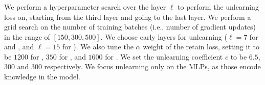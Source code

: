 \subsubsection{\method{}}
We perform a hyperparameter search over the layer $\ell$ to perform the unlearning loss on, starting from the third layer and going to the last layer. We perform a grid search on the number of training batches (i.e., number of gradient updates) in the range of $[150, 300, 500]$. We choose early layers for unlearning ($\ell=7$ for \zephyr{} and \mixtral{}, and $\ell=15$ for \yi{}). We also tune the $\alpha$ weight of the retain loss, setting it to be $1200$ for \zephyr{}, $350$ for \yi{}, and $1600$ for \mixtral{}. We set the unlearning coefficient $c$ to be $6.5$, $300$ and $300$ respectively. We focus unlearning only on the MLPs, as those encode knowledge in the model.   
